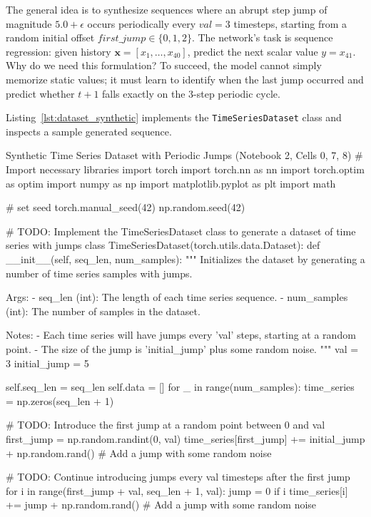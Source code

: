\documentclass[11pt,a4paper]{article}
\begin{document}
The general idea is to synthesize sequences where an abrupt step jump of magnitude $5.0 + \epsilon$ occurs periodically every $val = 3$ timesteps, starting from a random initial offset $first\_jump \in \{0, 1, 2\}$. The network's task is sequence regression: given history $\mathbf{x} = [x_1, \dots, x_{40}]$, predict the next scalar value $y = x_{41}$. Why do we need this formulation? To succeed, the model cannot simply memorize static values; it must learn to identify when the last jump occurred and predict whether $t+1$ falls exactly on the 3-step periodic cycle.

Listing~\ref{lst:dataset_synthetic} implements the \texttt{TimeSeriesDataset} class and inspects a sample generated sequence.

\begin{solutioncode}[label=lst:dataset_synthetic]{Synthetic Time Series Dataset with Periodic Jumps (Notebook 2, Cells 0, 7, 8)}
# Import necessary libraries
import torch
import torch.nn as nn
import torch.optim as optim
import numpy as np
import matplotlib.pyplot as plt
import math

# set seed 
torch.manual_seed(42)
np.random.seed(42)

# TODO: Implement the TimeSeriesDataset class to generate a dataset of time series with jumps
class TimeSeriesDataset(torch.utils.data.Dataset):
    def __init__(self, seq_len, num_samples):
        """
        Initializes the dataset by generating a number of time series samples with jumps.

        Args:
        - seq_len (int): The length of each time series sequence.
        - num_samples (int): The number of samples in the dataset.
        
        Notes:
        - Each time series will have jumps every 'val' steps, starting at a random point.
        - The size of the jump is 'initial_jump' plus some random noise.
        """
        val = 3  
        initial_jump = 5 
        
        self.seq_len = seq_len
        self.data = []
        for _ in range(num_samples):
            time_series = np.zeros(seq_len + 1)
            
            # TODO: Introduce the first jump at a random point between 0 and val
            first_jump = np.random.randint(0, val)
            time_series[first_jump] += initial_jump + np.random.rand()  # Add a jump with some random noise
            
            # TODO: Continue introducing jumps every val timesteps after the first jump
            for i in range(first_jump + val, seq_len + 1, val):
                jump = 0 if i %
                time_series[i] += jump + np.random.rand()  # Add a jump with some random noise
            

\end{solutioncode}
\end{document}
